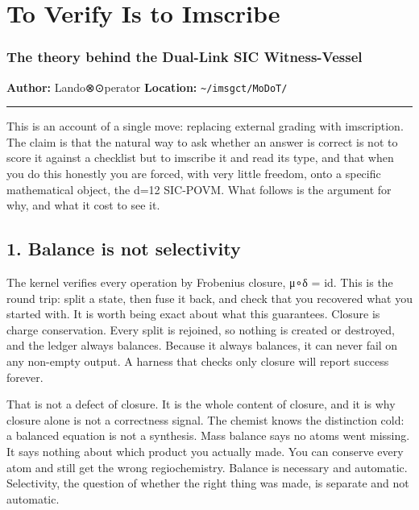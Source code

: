 \hypertarget{to-verify-is-to-imscribe}{%
\section{To Verify Is to Imscribe}\label{to-verify-is-to-imscribe}}

\hypertarget{the-theory-behind-the-dual-link-sic-witness-vessel}{%
\subsubsection{The theory behind the Dual-Link SIC
Witness-Vessel}\label{the-theory-behind-the-dual-link-sic-witness-vessel}}

\textbf{Author:} Lando⊗⊙perator \textbf{Location:}
\texttt{\textasciitilde{}/imsgct/MoDoT/}

\begin{center}\rule{0.5\linewidth}{0.5pt}\end{center}

This is an account of a single move: replacing external grading with
imscription. The claim is that the natural way to ask whether an answer
is correct is not to score it against a checklist but to imscribe it and
read its type, and that when you do this honestly you are forced, with
very little freedom, onto a specific mathematical object, the d=12
SIC-POVM. What follows is the argument for why, and what it cost to see
it.

\hypertarget{balance-is-not-selectivity}{%
\subsection{1. Balance is not
selectivity}\label{balance-is-not-selectivity}}

The kernel verifies every operation by Frobenius closure, μ∘δ = id. This
is the round trip: split a state, then fuse it back, and check that you
recovered what you started with. It is worth being exact about what this
guarantees. Closure is charge conservation. Every split is rejoined, so
nothing is created or destroyed, and the ledger always balances. Because
it always balances, it can never fail on any non-empty output. A harness
that checks only closure will report success forever.

That is not a defect of closure. It is the whole content of closure, and
it is why closure alone is not a correctness signal. The chemist knows
the distinction cold: a balanced equation is not a synthesis. Mass
balance says no atoms went missing. It says nothing about which product
you actually made. You can conserve every atom and still get the wrong
regiochemistry. Balance is necessary and automatic. Selectivity, the
question of whether the right thing was made, is separate and not
automatic.

